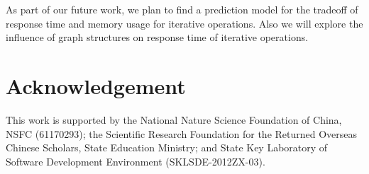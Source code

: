 \documentclass[12pt,conference,letterpaper]{IEEEtran}
\begin{document}
As part of our future work, we plan to find a prediction model for the tradeoff of response time and memory usage for iterative operations. Also we will explore the influence of graph structures on response time of iterative operations.


\section*{Acknowledgement}
This work is supported by the National Nature Science Foundation of China, NSFC (61170293); the Scientific Research Foundation for the Returned Overseas Chinese Scholars, State Education Ministry; and State Key Laboratory of Software Development Environment (SKLSDE-2012ZX-03).





%
\end{document}
